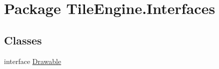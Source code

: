 \hypertarget{namespace_tile_engine_1_1_interfaces}{\section{Package Tile\-Engine.\-Interfaces}
\label{namespace_tile_engine_1_1_interfaces}
}
\subsection*{Classes}
\begin{DoxyCompactItemize}
\item 
interface \hyperlink{interface_tile_engine_1_1_interfaces_1_1_drawable}{Drawable}
\end{DoxyCompactItemize}
